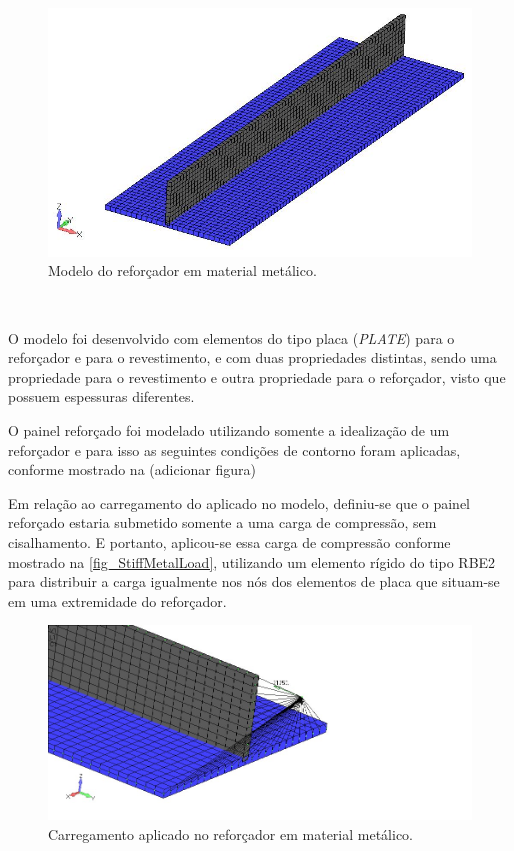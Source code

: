 {\begin{figure}[ht]
	\caption{\label{fig_StiffMetal}Modelo do reforçador em material metálico.}
  \centering
  \includegraphics[scale=0.7]{figura/StiffMetal}
\end{figure}
\

O modelo foi desenvolvido com elementos do tipo placa (\emph{PLATE}) para o reforçador e para o revestimento, e com duas propriedades distintas, sendo uma propriedade para o revestimento e outra propriedade para o reforçador, visto que possuem espessuras diferentes.

O painel reforçado foi modelado utilizando somente a idealização de um reforçador e para isso as seguintes condições de contorno foram aplicadas, conforme mostrado na (adicionar figura)%


Em relação ao carregamento do aplicado no modelo, definiu-se que o painel reforçado estaria submetido somente a uma carga de compressão, sem cisalhamento. E portanto, aplicou-se essa carga de compressão conforme mostrado na \autoref{fig_StiffMetalLoad},
utilizando um elemento rígido do tipo RBE2 para distribuir a carga igualmente nos nós dos elementos de placa que situam-se em uma extremidade do reforçador.

\begin{figure}[h]
	\caption{\label{fig_StiffMetalLoad}Carregamento aplicado no reforçador em material metálico.}
  \centering
  \includegraphics[scale=0.7]{figura/StiffMetalLoad}
\end{figure}
\

}

